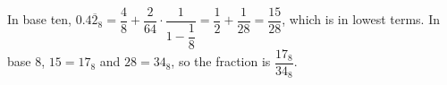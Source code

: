 In base ten, $0.4\overline2_8=\dfrac{4}{8}+\dfrac{2}{64}\cdot\dfrac{1}{1-\dfrac{1}{8}}=\dfrac{1}{2}+\dfrac{1}{28}=\dfrac{15}{28}$, which is in lowest terms. In base $8$, $15=17_8$ and $28=34_8$, so the fraction is $\boxed{\dfrac{17_8}{34_8}}$.

